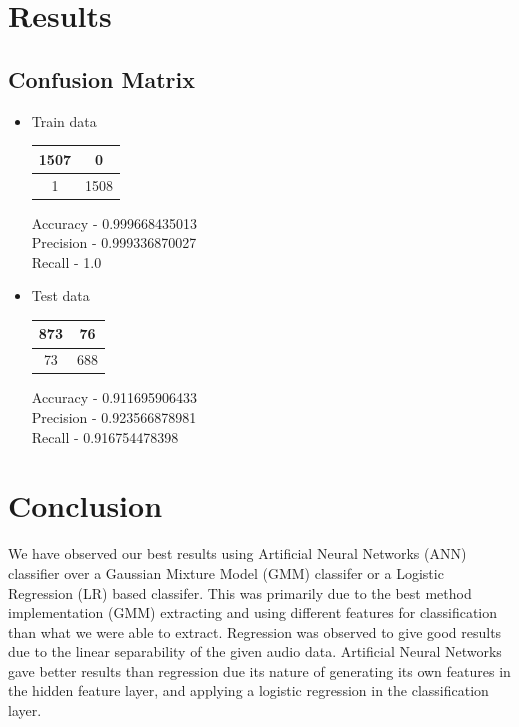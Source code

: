 \documentclass[12pt]{article}
\begin{document}
\section{Results}
\subsection{Confusion Matrix}
\begin{itemize}
	\item Train data
\begin{center}
	\begin{tabular}{|c|c|}
		\hline 
		1507 &0 	\\
		\hline
		1    & 1508  	\\
		\hline
	\end{tabular}
\end{center}
Accuracy - 0.999668435013\\
Precision - 0.999336870027\\
Recall - 1.0\\
	\item Test data
\begin{center}
	\begin{tabular}{|c|c|}
		\hline 
		873&76	\\
		\hline
		73&688	\\
		\hline
	\end{tabular}
\end{center}
Accuracy - 0.911695906433\\
Precision - 0.923566878981\\
Recall - 0.916754478398\\
\clearpage
\end{itemize}

\section{Conclusion}
We have observed our best results using Artificial Neural Networks (ANN) classifier over a Gaussian Mixture Model (GMM) classifer or a Logistic Regression (LR) based classifer. This was primarily due to the best method implementation (GMM) extracting and using different features for classification than what we were able to extract. Regression was observed to give good results due to the linear separability of the given audio data. Artificial Neural Networks gave better results than regression due its nature of generating its own features in the hidden feature layer, and applying a logistic regression in the classification layer.
\end{document}
